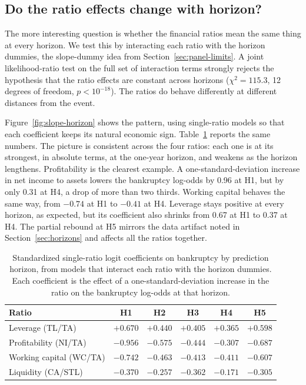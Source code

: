 \documentclass[12pt,a4paper]{article}
\begin{document}
\subsection{Do the ratio effects change with horizon?}

The more interesting question is whether the financial ratios mean the same
thing at every horizon. We test this by interacting each ratio with the horizon
dummies, the slope-dummy idea from Section~\ref{sec:panel-limits}. A joint
likelihood-ratio test on the full set of interaction terms strongly rejects the
hypothesis that the ratio effects are constant across horizons
($\chi^2 = 115.3$, 12 degrees of freedom, $p < 10^{-18}$). The ratios do behave
differently at different distances from the event.

Figure~\ref{fig:slope-horizon} shows the pattern, using single-ratio models so
that each coefficient keeps its natural economic sign. Table~\ref{tab:slopes}
reports the same numbers. The picture is consistent across the four ratios:
each one is at its strongest, in absolute terms, at the one-year horizon, and
weakens as the horizon lengthens. Profitability is the clearest example. A
one-standard-deviation increase in net income to assets lowers the bankruptcy
log-odds by 0.96 at H1, but by only 0.31 at H4, a drop of more than two thirds.
Working capital behaves the same way, from $-0.74$ at H1 to $-0.41$ at H4.
Leverage stays positive at every horizon, as expected, but its coefficient also
shrinks from 0.67 at H1 to 0.37 at H4. The partial rebound at H5 mirrors the
data artifact noted in Section~\ref{sec:horizons} and affects all the ratios
together.

\begin{table}[H]
\centering
\caption{Standardized single-ratio logit coefficients on bankruptcy by
prediction horizon, from models that interact each ratio with the horizon
dummies. Each coefficient is the effect of a one-standard-deviation increase in
the ratio on the bankruptcy log-odds at that horizon.}
\label{tab:slopes}
\small
\begin{tabular}{lccccc}
\toprule
Ratio & H1 & H2 & H3 & H4 & H5 \\
\midrule
Leverage (TL/TA)          & $+0.670$ & $+0.440$ & $+0.405$ & $+0.365$ & $+0.598$ \\
Profitability (NI/TA)     & $-0.956$ & $-0.575$ & $-0.444$ & $-0.307$ & $-0.687$ \\
Working capital (WC/TA)   & $-0.742$ & $-0.463$ & $-0.413$ & $-0.411$ & $-0.607$ \\
Liquidity (CA/STL)        & $-0.370$ & $-0.257$ & $-0.362$ & $-0.171$ & $-0.305$ \\
\bottomrule
\end{tabular}
\end{table}
\end{document}
